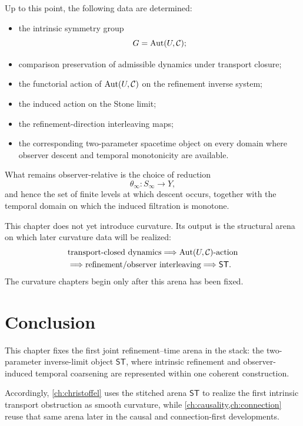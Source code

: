 \begin{remark}
	Up to this point, the following data are determined:
	\begin{itemize}
		\item
		      the intrinsic symmetry group
		      \[
			      G=\operatorname{Aut}(U,\mathcal C);
		      \]
		\item
		      comparison preservation of admissible dynamics under transport closure;
		\item
		      the functorial action of \(\operatorname{Aut}(U,\mathcal C)\) on the refinement
		      inverse system;
		\item
		      the induced action on the Stone limit;
		\item
		      the refinement-direction interleaving maps;
		\item
		      the corresponding two-parameter spacetime object on every domain where
		      observer descent and temporal monotonicity are available.
	\end{itemize}
	What remains observer-relative is the choice of reduction
	\[
		\theta_\infty\colon S_\infty\to Y,
	\]
	and hence the set of finite levels at which descent occurs, together
	with the temporal domain on which the induced filtration is monotone.
\end{remark}
\begin{remark}
	This chapter does not yet introduce curvature.
	Its output is the structural arena on which later curvature data will
	be realized:
	\[
		\begin{aligned}
			 & \text{transport-closed dynamics}
			\Longrightarrow
			\operatorname{Aut}(U,\mathcal C)\text{-action}
			\\
			 & \Longrightarrow
			\text{refinement/observer interleaving}
			\Longrightarrow
			\mathsf{ST}.
		\end{aligned}
	\]
	The curvature chapters begin only after this arena has been fixed.
\end{remark}

\section{Conclusion}
\label{sec:stitching-conclusion}
This chapter fixes the first joint refinement--time arena in the stack:
the two-parameter inverse-limit object \(\mathsf{ST}\), where intrinsic
refinement and observer-induced temporal coarsening are represented within
one coherent construction.

Accordingly, \cref{ch:christoffel} uses the stitched arena \(\mathsf{ST}\)
to realize the first intrinsic transport obstruction as smooth
curvature, while \cref{ch:causality,ch:connection} reuse that same arena
later in the causal and connection-first developments.

\begin{chapterclosing}
\end{chapterclosing}
